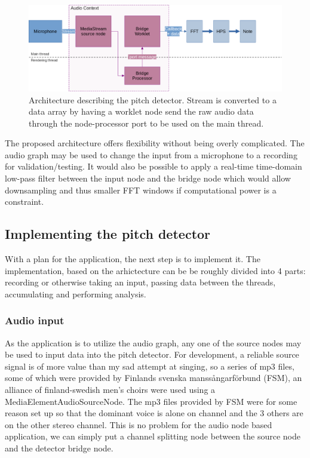 \begin{figure}[ht]
    \centering
    \includegraphics[width=\textwidth]{./images/pdArchitecture.png}
    \caption{Architecture describing the pitch detector. Stream is converted to a data array by having a worklet node send the raw audio data through the node-processor port to be used on the main thread.\label{fig:pdArch}}
\end{figure}

The proposed architecture offers flexibility without being overly complicated. The audio graph may be used to change the input from a microphone to a recording for validation/testing. It would also be possible to apply a real-time time-domain low-pass filter between the input node and the bridge node which would allow downsampling and thus smaller FFT windows if computational power is a constraint. 

\subsection{Implementing the pitch detector}
With a plan for the application, the next step is to implement it. The implementation, based on the arhictecture can be be roughly divided into 4 parts: recording or otherwise taking an input, passing data between the threads, accumulating and performing analysis.
\subsubsection{Audio input}
As the application is to utilize the audio graph, any one of the source nodes may be used to input data into the pitch detector. For development, a reliable source signal is of more value than my sad attempt at singing, so a series of mp3 files, some of which were provided by Finlands svenska manssångarförbund (FSM), an alliance of finland-swedish men's choirs were used using a MediaElementAudioSourceNode. The mp3 files provided by FSM were for some reason set up so that the dominant voice is alone on channel and the 3 others are on the other stereo channel. This is no problem for the audio node based application, we can simply put a channel splitting node between the source node and the detector bridge node.

